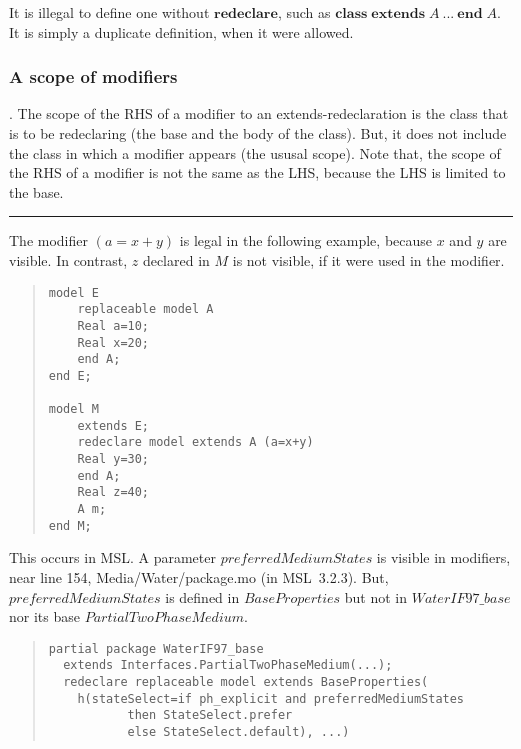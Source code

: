 \documentclass[10pt,b5paper]{article}
\newcounter{ruleno}
\def\tombstone{\rule[-.2ex]{.3em}{1.8ex}}
\newenvironment{widequote}{%
\list{}{\leftmargin=0mm\rightmargin=\leftmargin}%
\item\relax}{\endlist}
\def\rulelead{\refstepcounter{ruleno}{\bf{}Rule~\arabic{ruleno}}.}
\newenvironment{QRULE}{\begin{widequote}\rulelead}%
{\unskip\nobreakspace\tombstone\end{widequote}\ignorespacesafterend}
\begin{document}
It is illegal to define one without $\mathbf{redeclare}$, such as
$\mathbf{class}\;\mathbf{extends}\;A~...~\mathbf{end}\;A$.  It is
simply a duplicate definition, when it were allowed.


\subsubsection*{A scope of modifiers}

\begin{QRULE}\label{scope-rule-in-extends-redeclaration} The scope of
the RHS of a modifier to an extends-redeclaration is the class that is
to be redeclaring (the base and the body of the class).  But, it does
not include the class in which a modifier appears (the ususal scope).
Note that, the scope of the RHS of a modifier is not the same as the
LHS, because the LHS is limited to the base.\end{QRULE}

The modifier $(a=x+y)$ is legal in the following example, because $x$
and $y$ are visible.  In contrast, $z$ declared in $M$ is not visible,
if it were used in the modifier.

\begin{quote}
\begin{lstlisting}[aboveskip=-\baselineskip]
model E
    replaceable model A
	Real a=10;
	Real x=20;
    end A;
end E;

model M
    extends E;
    redeclare model extends A (a=x+y)
	Real y=30;
    end A;
    Real z=40;
    A m;
end M;
\end{lstlisting}
\end{quote}

This occurs in MSL.  A parameter $\mathit{preferredMediumStates}$ is
visible in modifiers, near line 154, Media/Water/package.mo (in
MSL~3.2.3).  But, $\mathit{preferredMediumStates}$ is defined in
$\mathit{BaseProperties}$ but not in $\mathit{WaterIF97\_base}$ nor
its base $\mathit{PartialTwoPhaseMedium}$.

\begin{quote}
\begin{lstlisting}[aboveskip=-\baselineskip]
partial package WaterIF97_base
  extends Interfaces.PartialTwoPhaseMedium(...);
  redeclare replaceable model extends BaseProperties(
    h(stateSelect=if ph_explicit and preferredMediumStates
           then StateSelect.prefer
           else StateSelect.default), ...)
\end{lstlisting}
\end{quote}
\end{document}
